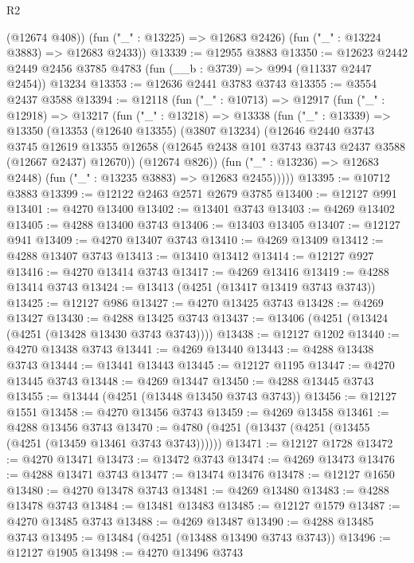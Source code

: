 \begin{lexlean}{R2}
\begin{coremodule}
        (@12674 @408))
      (fun ("_" : @13225) => @12683 @2426)
      (fun ("_" : @13224 @3883) => @12683 @2433))
@13339 := @12955 @3883
@13350 := @12623
    @2442
    @2449
    @2456
    @3785
    @4783
    (fun (__b : @3739) => @994 (@11337 @2447 @2454))
    @13234
@13353 := @12636 @2441 @3783 @3743
@13355 := @3554 @2437 @3588
@13394 := @12118
    (fun ("_" : @10713) =>
    @12917
      (fun ("_" : @12918) =>
      @13217
        (fun ("_" : @13218) =>
        @13338
          (fun ("_" : @13339) =>
          @13350
            (@13353
              (@12640 @13355)
              (@3807 @13234)
              (@12646
                @2440
                @3743
                @3745
                @12619
                @13355
                @12658
                (@12645 @2438 @101 @3743 @3743 @2437 @3588 (@12667 @2437) @12670))
              (@12674 @826))
            (fun ("_" : @13236) => @12683 @2448)
            (fun ("_" : @13235 @3883) => @12683 @2455)))))
@13395 := @10712 @3883
@13399 := @12122 @2463 @2571 @2679 @3785
@13400 := @12127 @991
@13401 := @4270 @13400
@13402 := @13401 @3743
@13403 := @4269 @13402
@13405 := @4288 @13400 @3743
@13406 := @13403 @13405
@13407 := @12127 @941
@13409 := @4270 @13407 @3743
@13410 := @4269 @13409
@13412 := @4288 @13407 @3743
@13413 := @13410 @13412
@13414 := @12127 @927
@13416 := @4270 @13414 @3743
@13417 := @4269 @13416
@13419 := @4288 @13414 @3743
@13424 := @13413 (@4251 (@13417 @13419 @3743 @3743))
@13425 := @12127 @986
@13427 := @4270 @13425 @3743
@13428 := @4269 @13427
@13430 := @4288 @13425 @3743
@13437 := @13406 (@4251 (@13424 (@4251 (@13428 @13430 @3743 @3743))))
@13438 := @12127 @1202
@13440 := @4270 @13438 @3743
@13441 := @4269 @13440
@13443 := @4288 @13438 @3743
@13444 := @13441 @13443
@13445 := @12127 @1195
@13447 := @4270 @13445 @3743
@13448 := @4269 @13447
@13450 := @4288 @13445 @3743
@13455 := @13444 (@4251 (@13448 @13450 @3743 @3743))
@13456 := @12127 @1551
@13458 := @4270 @13456 @3743
@13459 := @4269 @13458
@13461 := @4288 @13456 @3743
@13470 := @4780 (@4251 (@13437 (@4251 (@13455 (@4251 (@13459 @13461 @3743 @3743))))))
@13471 := @12127 @1728
@13472 := @4270 @13471
@13473 := @13472 @3743
@13474 := @4269 @13473
@13476 := @4288 @13471 @3743
@13477 := @13474 @13476
@13478 := @12127 @1650
@13480 := @4270 @13478 @3743
@13481 := @4269 @13480
@13483 := @4288 @13478 @3743
@13484 := @13481 @13483
@13485 := @12127 @1579
@13487 := @4270 @13485 @3743
@13488 := @4269 @13487
@13490 := @4288 @13485 @3743
@13495 := @13484 (@4251 (@13488 @13490 @3743 @3743))
@13496 := @12127 @1905
@13498 := @4270 @13496 @3743

\end{coremodule}
\end{lexlean}
